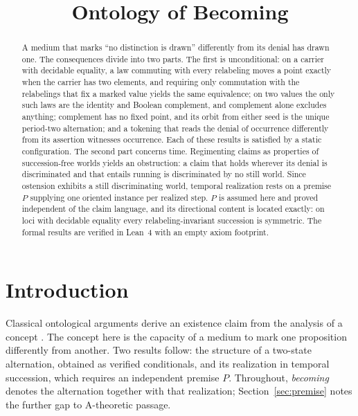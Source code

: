 \documentclass[11pt]{article}
\title{Ontology of Becoming}
\date{}
\begin{document}
\maketitle
\vspace{-2.5em}

\begin{abstract}
A medium that marks ``no distinction is drawn'' differently from its denial has drawn one. The consequences divide into two parts. The first is unconditional: on a carrier with decidable equality, a law commuting with every relabeling moves a point exactly when the carrier has two elements, and requiring only commutation with the relabelings that fix a marked value yields the same equivalence; on two values the only such laws are the identity and Boolean complement, and complement alone excludes anything; complement has no fixed point, and its orbit from either seed is the unique period-two alternation; and a tokening that reads the denial of occurrence differently from its assertion witnesses occurrence. Each of these results is satisfied by a static configuration. The second part concerns time. Regimenting claims as properties of succession-free worlds yields an obstruction: a claim that holds wherever its denial is discriminated and that entails running is discriminated by no still world. Since ostension exhibits a still discriminating world, temporal realization rests on a premise $P$ supplying one oriented instance per realized step. $P$ is assumed here and proved independent of the claim language, and its directional content is located exactly: on loci with decidable equality every relabeling-invariant succession is symmetric. The formal results are verified in Lean~4 with an empty axiom footprint.
\end{abstract}

\section{Introduction}
\label{sec:intro}

Classical ontological arguments derive an existence claim from the analysis of a concept \cite{anselm,descartes,godel1995}. The concept here is the capacity of a medium to mark one proposition differently from another. Two results follow: the structure of a two-state alternation, obtained as verified conditionals, and its realization in temporal succession, which requires an independent premise $P$. Throughout, \emph{becoming} denotes the alternation together with that realization; Section~\ref{sec:premise} notes the further gap to A-theoretic passage.
\end{document}
